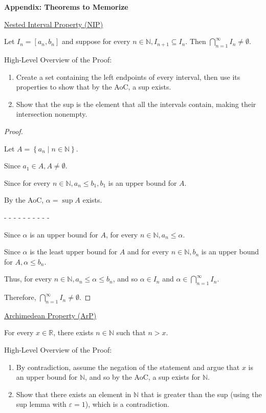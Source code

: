 \documentclass[12pt]{article}
\newcommand{\RR}{\mathbb{R}} %
\newcommand{\NN}{\mathbb{N}}
\newcommand\set[1]{\left\lbrace #1 \right\rbrace} %
\newcommand{\eps}{\varepsilon}
\begin{document}
\pagebreak

\textbf{Appendix: Theorems to Memorize}

\hrulefill

\underline{Nested Interval Property (NIP)}

Let $I_n = [a_n, b_n]$ and suppose for every $n \in \NN, I_{n + 1} \subseteq {I_n}$. Then $\bigcap_{n = 1}^{\infty} I_n \ne \emptyset$.

\dotfill

High-Level Overview of the Proof:
\begin{enumerate}
\item Create a set containing the left endpoints of every interval, then use its properties to show that by the AoC, a sup exists.

\item Show that the sup is the element that all the intervals contain, making their intersection nonempty.
\end{enumerate}

\dotfill

\begin{proof}
$ $

Let $A = \set{a_n \mid n \in \NN}$.

Since $a_1 \in A, A \ne \emptyset$.

Since for every $n \in \NN, a_n \le b_1, b_1$ is an upper bound for $A$.

By the AoC, $\alpha = \sup A$ exists.

- - - - - - - - - -

Since $\alpha$ is an upper bound for $A$, for every $n \in \NN, a_n \le \alpha$.

Since $\alpha$ is the least upper bound for $A$ and for every $n \in \NN, b_n$ is an upper bound for $A, \alpha \le b_n$.

Thus, for every $n \in \NN, a_n \le \alpha \le b_n$, and so $\alpha \in I_n$ and $\alpha \in \bigcap_{n = 1}^{\infty} I_n$.

Therefore, $\bigcap_{n = 1}^{\infty} I_n \ne \emptyset$.
\end{proof}

\pagebreak

\underline{Archimedean Property (ArP)}

For every $x \in \RR$, there exists $n \in \NN$ such that $n > x$.

\dotfill

High-Level Overview of the Proof:

\begin{enumerate}
\item By contradiction, assume the negation of the statement and argue that $x$ is an upper bound for $\NN$, and so by the AoC, a sup exists for $\NN$.

\item Show that there exists an element in $\NN$ that is greater than the sup (using the sup lemma with $\eps = 1$), which is a contradiction.
\end{enumerate}
\end{document}
